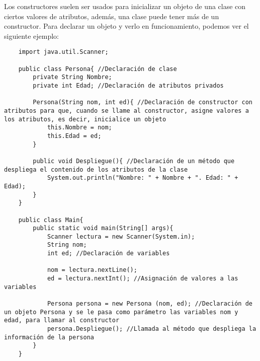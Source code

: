 Los constructores suelen ser usados para inicializar un objeto de una clase con ciertos valores de atributos, además, una clase puede tener más de un constructor. Para declarar un objeto y verlo en funcionamiento, podemos ver el siguiente ejemplo:
\begin{lstlisting}
    import java.util.Scanner;
    
    public class Persona{ //Declaración de clase
        private String Nombre;
        private int Edad; //Declaración de atributos privados
        
        Persona(String nom, int ed){ //Declaración de constructor con atributos para que, cuando se llame al constructor, asigne valores a los atributos, es decir, inicialice un objeto
            this.Nombre = nom;
            this.Edad = ed;
        }
        
        public void Despliegue(){ //Declaración de un método que despliega el contenido de los atributos de la clase
            System.out.println("Nombre: " + Nombre + ". Edad: " + Edad);
        }
    }
    
    public class Main{
        public static void main(String[] args){
            Scanner lectura = new Scanner(System.in);
            String nom;
            int ed; //Declaración de variables
            
            nom = lectura.nextLine();
            ed = lectura.nextInt(); //Asignación de valores a las variables
            
            Persona persona = new Persona (nom, ed); //Declaración de un objeto Persona y se le pasa como parámetro las variables nom y edad, para llamar al constructor
            persona.Despliegue(); //Llamada al método que despliega la información de la persona
        }
    }
\end{lstlisting}


